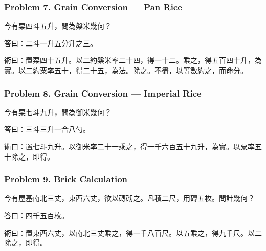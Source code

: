 \documentclass[11pt,a4paper]{article}
\newcommand{\zh}[1]{{\CJKfamily{}#1}}
\begin{document}
\subsubsection*{Problem 7. Grain Conversion --- Pan Rice}

\begin{problembox}[title=\zh{問}]
\zh{今有粟四斗五升，問為槃米幾何？}
\end{problembox}
\begin{answerbox}[title=\zh{答}]
\zh{答曰：二斗一升五分升之三。}
\end{answerbox}
\begin{methodbox}[title=\zh{術}]
\zh{術曰：置粟四十五升。以二約槃米率二十四，得一十二。乘之，得五百四十升，為實。以二約粟率五十，得二十五，為法。除之。不盡，以等數約之，而命分。}
\end{methodbox}

\subsubsection*{Problem 8. Grain Conversion --- Imperial Rice}

\begin{problembox}[title=\zh{問}]
\zh{今有粟七斗九升，問為御米幾何？}
\end{problembox}
\begin{answerbox}[title=\zh{答}]
\zh{答曰：三斗三升一合八勺。}
\end{answerbox}
\begin{methodbox}[title=\zh{術}]
\zh{術曰：置七斗九升。以御米率二十一乘之，得一千六百五十九升，為實。以粟率五十除之，即得。}
\end{methodbox}

\subsubsection*{Problem 9. Brick Calculation}

\begin{problembox}[title=\zh{問}]
\zh{今有屋基南北三丈，東西六丈，欲以磚砌之。凡積二尺，用磚五枚。問計幾何？}
\end{problembox}
\begin{answerbox}[title=\zh{答}]
\zh{答曰：四千五百枚。}
\end{answerbox}
\begin{methodbox}[title=\zh{術}]
\zh{術曰：置東西六丈，以南北三丈乘之，得一千八百尺。以五乘之，得九千尺。以二除之，即得。}
\end{methodbox}
\end{document}
